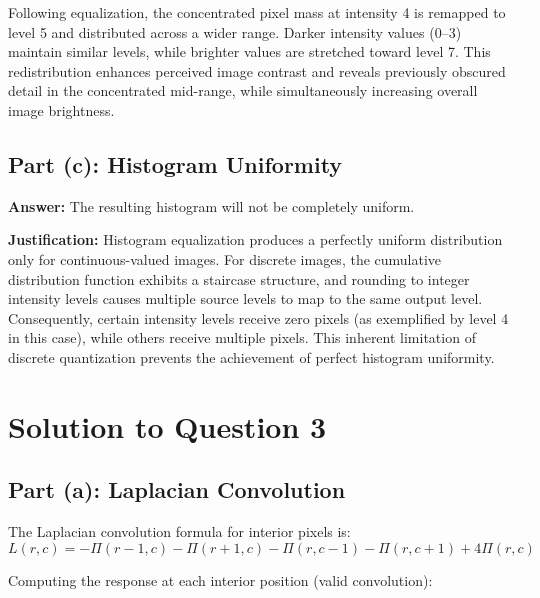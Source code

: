 \documentclass[12pt,a4paper]{article}
\begin{document}
Following equalization, the concentrated pixel mass at intensity 4 is remapped to level 5 and distributed across a wider range. Darker intensity values (0--3) maintain similar levels, while brighter values are stretched toward level 7. This redistribution enhances perceived image contrast and reveals previously obscured detail in the concentrated mid-range, while simultaneously increasing overall image brightness.

\subsection*{Part (c): Histogram Uniformity}

\textbf{Answer:} The resulting histogram will not be completely uniform.

\textbf{Justification:} Histogram equalization produces a perfectly uniform distribution only for continuous-valued images. For discrete images, the cumulative distribution function exhibits a staircase structure, and rounding to integer intensity levels causes multiple source levels to map to the same output level. Consequently, certain intensity levels receive zero pixels (as exemplified by level 4 in this case), while others receive multiple pixels. This inherent limitation of discrete quantization prevents the achievement of perfect histogram uniformity.

\vspace{1.0cm}
\section*{Solution to Question 3}

\subsection*{Part (a): Laplacian Convolution}

The Laplacian convolution formula for interior pixels is:
\begin{equation*}
L(r,c) = -\Pi(r-1,c) - \Pi(r+1,c) - \Pi(r,c-1) - \Pi(r,c+1) + 4\Pi(r,c)
\end{equation*}

Computing the response at each interior position (valid convolution):
\end{document}
